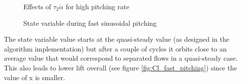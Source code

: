 \begin{figure}[h]
  \centering
  \caption{Effects of $\tau_2 \dot{\alpha}$ for high pitching rate}
  \label{fig:alpha_dalpha_vs_t}
\end{figure}

\begin{figure}[h]
  \centering
  \caption{State variable during fast sinusoidal pitching}
  \label{fig:x_fast_pitching}
\end{figure}
\FloatBarrier

\par The state variable value starts at the quasi-steady value (as designed in the algorithm implementation) but after a couple of cycles it orbits close to an average value that would correspond to separated flows in a quasi-steady case.
This also leads to lower lift overall (see figure \ref{fig:Cl_fast_pitching}) since the value of x is smaller.

